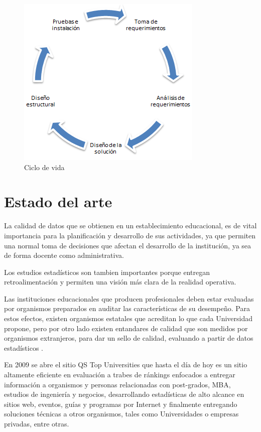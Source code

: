 \documentclass[a4paper,12pt,openany,oneside]{book}
\begin{document}
\begin{figure}[!hbp]
\begin{center}
\includegraphics[scale=0.6,angle=0]{images/cicloMini.PNG}
\caption{Ciclo de vida}
\label{Organigrama de rectoria}
\end{center}
\end{figure}
\section{Estado del arte}
La calidad de datos que se obtienen en un establecimiento educacional, es de vital importancia para la planificación y desarrollo de sus actividades, ya que permiten una normal toma de decisiones que afectan el desarrollo de la institución, ya sea de forma docente como administrativa. 

Los estudios estadísticos son tambien importantes porque entregan retroalimentación y permiten una visión más clara de la realidad operativa.

Las instituciones educacionales que producen profesionales deben estar evaluadas por organismos preparados en auditar las características de su desempeño. Para estos efectos, existen organismos estatales que acreditan lo que cada Universidad propone, pero por otro lado existen entandares de calidad que son medidos por organismos extranjeros, para dar un sello de calidad, evaluando a partir de datos estadísticos  \cite{data1}.

En 2009 se abre el sitio QS Top Universities que hasta el día de hoy es un sitio altamente eficiente en evaluación a trabes de ránkings enfocados a entregar información a organismos y personas relacionadas con post-grados, MBA, estudios de ingeniería y negocios, desarrollando estadísticas de alto alcance en sitios web, eventos, guías y programas por Internet y finalmente entregando soluciones técnicas a otros organismos, tales como Universidades o empresas privadas, entre otras.
\end{document}
